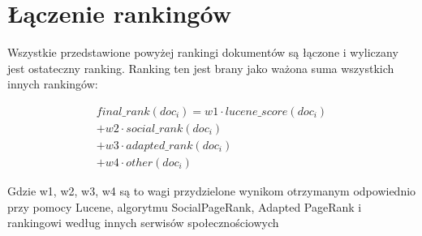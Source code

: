 \section{Łączenie rankingów}

Wszystkie przedstawione powyżej rankingi dokumentów są łączone i wyliczany jest ostateczny ranking. Ranking ten jest brany jako ważona suma wszystkich innych rankingów:


\begin{equation}
\begin{split}
final\_rank(doc_i) = w1 \cdot lucene\_score(doc_i)  \\ 
+ w2 \cdot  social\_rank(doc_i)  \\ 
+ w3 \cdot  adapted\_rank(doc_i)\\
+ w4 \cdot  other(doc_i)
\end{split}
\label{eq:final_rank}
\end{equation}

Gdzie w1, w2, w3, w4 są to wagi przydzielone wynikom otrzymanym odpowiednio przy pomocy Lucene, algorytmu SocialPageRank, Adapted PageRank i rankingowi według innych serwisów społecznościowych